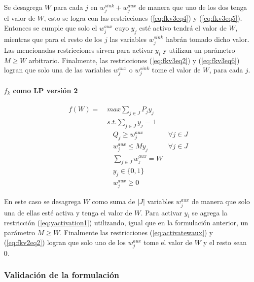 \documentclass{article}
\begin{document}
  Se desagrega $W$ para cada $j$ en $w^{sink}_j + w^{aux}_j$ de manera que uno de los dos tenga el valor de $W$, esto se logra con las restricciones (\ref{eq:fkv3eq4}) y (\ref{eq:fkv3eq5}). Entonces se cumple que solo el $w^{aux}_j$ cuyo $y_j$ esté activo tendrá el valor de $W$, mientras que para el resto de los $j$ las variables $w^{sink}_j$ habrán tomado dicho valor. Las mencionadas restricciones sirven para activar $y_i$ y utilizan un parámetro $M \geq W$ arbitrario. Finalmente, las restricciones (\ref{eq:fkv3eq2}) y (\ref{eq:fkv3eq6}) logran que solo una de las variables $w^{aux}_j$ o $w^{sink}_j$ tome el valor de $W$, para cada $j$.

  \paragraph*{$f_k$ como LP versión 2}

  \begin{align}
    f(W) =\; & max \sum_{j \in J} P_j y_j             & \label{eq:fkv2eq1}\\
             & s.t. \sum_{j \in J} y_j = 1            & \label{eq:fkv2eq2}\\
             & \;\;\; Q_j \geq w^{aux}_j              & \forall j \in J \label{eq:implfkoriginalineq} \\
             & \;\;\; w^{aux}_j \leq M y_j            & \forall j \in J \label{eq:yactivation1} \\
             & \;\;\; \sum_{j \in J} w^{aux}_j = W    & \label{eq:activatewaux} \\
             & \;\;\; y_j \in \{0,1\}                 & \label{eq:fkv2domainy} \\
             & \;\;\; w^{aux}_j \geq 0                & \label{eq:fkv2eq6}
  \end{align}

  En este caso se desagrega $W$ como suma de $|J|$ variables $w^{aux}_j$ de manera que solo una de ellas esté activa y tenga el valor de $W$. Para activar $y_i$ se agrega la restricción (\ref{eq:yactivation1}) utilizando, igual que en la formulación anterior, un parámetro $M \geq W$. Finalmente las restricciones (\ref{eq:activatewaux}) y (\ref{eq:fkv2eq2}) logran que solo uno de los $w^{aux}_j$ tome el valor de $W$ y el resto sean 0.

  \subsubsection{Validación de la formulación}
\end{document}
